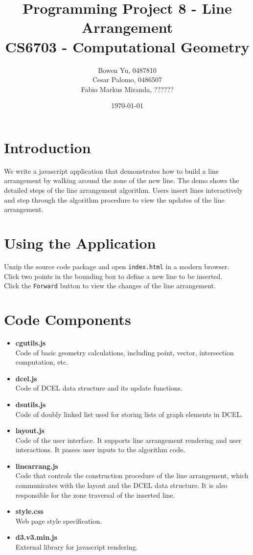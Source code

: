\documentclass[11pt]{article}
\title{\bf Programming Project 8 - Line Arrangement\\[2ex] 
       \rm\Large CS6703 - Computational Geometry}
\author{Bowen Yu, 0487810\\
		Cesar Palomo, 0486507\\
		Fabio Markus Miranda, ??????}
\date{\today}
\begin{document}
\maketitle
\large

\section{Introduction}

We write a javascript application that demonstrates how to build a line arrangement by walking around the zone of the new line. The demo shows the detailed steps of the line arrangement algorithm. Users insert lines interactively and step through the algorithm procedure to view the updates of the line arrangement. 

\section{Using the Application}
Unzip the source code package and open {\tt index.html} in a modern browser.\\
Click two points in the bounding box to define a new line to be inserted.\\
Click the {\tt Forward} button to view the changes of the line arrangement.

\section{Code Components}
\begin{itemize}
\item {\bf cgutils.js}\\
Code of basic geometry calculations, including point, vector, intersection computation, etc.
\item {\bf dcel.js}\\
Code of DCEL data structure and its update functions.
\item {\bf dsutils.js}\\
Code of doubly linked list used for storing lists of graph elements in DCEL. 
\item {\bf layout.js}\\
Code of the user interface. It supports line arrangement rendering and user interactions. It passes user inputs to the algorithm code.
\item {\bf linearrang.js}\\
Code that controls the construction procedure of the line arrangement, which communicates with the layout and the DCEL data structure. It is also responsible for the zone traversal of the inserted line.
\item {\bf style.css}\\
Web page style specification.
\item {\bf d3.v3.min.js}\\
External library for javascript rendering.
\end{itemize}
\end{document}
